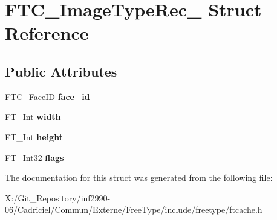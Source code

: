 \hypertarget{struct_f_t_c___image_type_rec__}{\section{F\-T\-C\-\_\-\-Image\-Type\-Rec\-\_\- Struct Reference}
\label{struct_f_t_c___image_type_rec__}
}
\subsection*{Public Attributes}
\begin{DoxyCompactItemize}
\item 
\hypertarget{struct_f_t_c___image_type_rec___a9851b8d4a06baacd18d5b9856fd85abd}{F\-T\-C\-\_\-\-Face\-I\-D {\bfseries face\-\_\-id}}\label{struct_f_t_c___image_type_rec___a9851b8d4a06baacd18d5b9856fd85abd}

\item 
\hypertarget{struct_f_t_c___image_type_rec___af1a4cccbabb0f5852ed755a12ed08dd8}{F\-T\-\_\-\-Int {\bfseries width}}\label{struct_f_t_c___image_type_rec___af1a4cccbabb0f5852ed755a12ed08dd8}

\item 
\hypertarget{struct_f_t_c___image_type_rec___adb56a9d18a3f522d713d0ba01c1a8778}{F\-T\-\_\-\-Int {\bfseries height}}\label{struct_f_t_c___image_type_rec___adb56a9d18a3f522d713d0ba01c1a8778}

\item 
\hypertarget{struct_f_t_c___image_type_rec___a391782ed8c67de86591c71f276ea6454}{F\-T\-\_\-\-Int32 {\bfseries flags}}\label{struct_f_t_c___image_type_rec___a391782ed8c67de86591c71f276ea6454}

\end{DoxyCompactItemize}


The documentation for this struct was generated from the following file\-:\begin{DoxyCompactItemize}
\item 
X\-:/\-Git\-\_\-\-Repository/inf2990-\/06/\-Cadriciel/\-Commun/\-Externe/\-Free\-Type/include/freetype/ftcache.\-h\end{DoxyCompactItemize}

